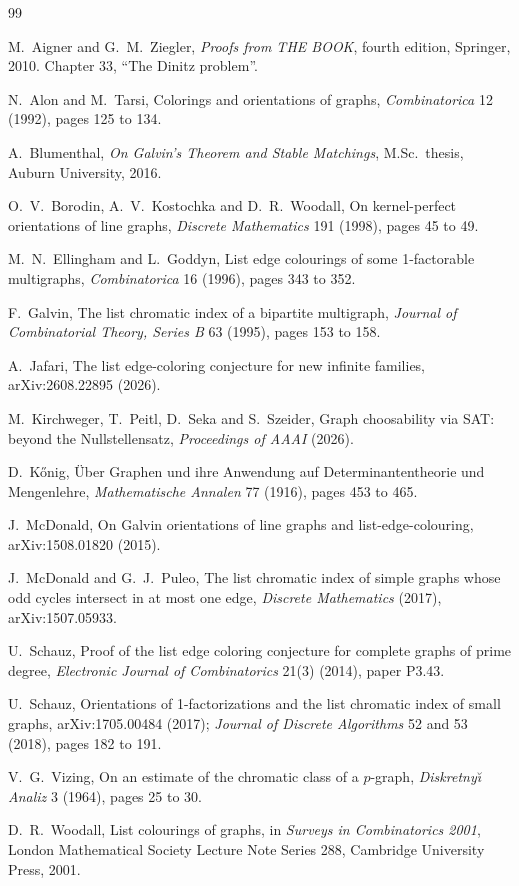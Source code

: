 \documentclass[11pt]{article}
\theoremstyle{plain}
\theoremstyle{definition}
\theoremstyle{remark}
\begin{document}
\begin{thebibliography}{99}

 M.~Aigner and G.~M.~Ziegler, \emph{Proofs from THE BOOK}, fourth edition,
  Springer, 2010. Chapter 33, ``The Dinitz problem''.

 N.~Alon and M.~Tarsi, Colorings and orientations of graphs, \emph{Combinatorica}
  12 (1992), pages 125 to 134.

 A.~Blumenthal, \emph{On Galvin's Theorem and Stable Matchings}, M.Sc.\
  thesis, Auburn University, 2016.

 O.~V.~Borodin, A.~V.~Kostochka and D.~R.~Woodall, On kernel-perfect orientations
  of line graphs, \emph{Discrete Mathematics} 191 (1998), pages 45 to 49.

 M.~N.~Ellingham and L.~Goddyn, List edge colourings of some 1-factorable
  multigraphs, \emph{Combinatorica} 16 (1996), pages 343 to 352.

 F.~Galvin, The list chromatic index of a bipartite multigraph, \emph{Journal of
  Combinatorial Theory, Series B} 63 (1995), pages 153 to 158.

 A.~Jafari, The list edge-coloring conjecture for new infinite families,
  arXiv:2608.22895 (2026).

 M.~Kirchweger, T.~Peitl, D.~Seka and S.~Szeider, Graph choosability via SAT:
  beyond the Nullstellensatz, \emph{Proceedings of AAAI} (2026).

 D.~K\H{o}nig, \"Uber Graphen und ihre Anwendung auf Determinantentheorie und
  Mengenlehre, \emph{Mathematische Annalen} 77 (1916), pages 453 to 465.

 J.~McDonald, On Galvin orientations of line graphs and list-edge-colouring,
  arXiv:1508.01820 (2015).

 J.~McDonald and G.~J.~Puleo, The list chromatic index of simple graphs whose odd
  cycles intersect in at most one edge, \emph{Discrete Mathematics} (2017), arXiv:1507.05933.

 U.~Schauz, Proof of the list edge coloring conjecture for complete graphs of
  prime degree, \emph{Electronic Journal of Combinatorics} 21(3) (2014), paper P3.43.

 U.~Schauz, Orientations of 1-factorizations and the list chromatic index of
  small graphs, arXiv:1705.00484 (2017); \emph{Journal of Discrete Algorithms} 52 and 53 (2018),
  pages 182 to 191.

 V.~G.~Vizing, On an estimate of the chromatic class of a $p$-graph,
  \emph{Diskretny\u{\i} Analiz} 3 (1964), pages 25 to 30.

 D.~R.~Woodall, List colourings of graphs, in \emph{Surveys in Combinatorics
  2001}, London Mathematical Society Lecture Note Series 288, Cambridge University Press, 2001.

\end{thebibliography}
\end{document}
